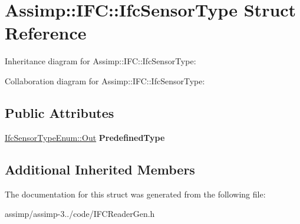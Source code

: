 \hypertarget{struct_assimp_1_1_i_f_c_1_1_ifc_sensor_type}{\section{Assimp\+:\+:I\+F\+C\+:\+:Ifc\+Sensor\+Type Struct Reference}
\label{struct_assimp_1_1_i_f_c_1_1_ifc_sensor_type}
}


Inheritance diagram for Assimp\+:\+:I\+F\+C\+:\+:Ifc\+Sensor\+Type\+:


Collaboration diagram for Assimp\+:\+:I\+F\+C\+:\+:Ifc\+Sensor\+Type\+:
\subsection*{Public Attributes}
\begin{DoxyCompactItemize}
\item 
\hypertarget{struct_assimp_1_1_i_f_c_1_1_ifc_sensor_type_a8156407f2e9b022223ee4cfb4c3347bf}{\hyperlink{classboost_1_1shared__ptr}{Ifc\+Sensor\+Type\+Enum\+::\+Out} {\bfseries Predefined\+Type}}\label{struct_assimp_1_1_i_f_c_1_1_ifc_sensor_type_a8156407f2e9b022223ee4cfb4c3347bf}

\end{DoxyCompactItemize}
\subsection*{Additional Inherited Members}


The documentation for this struct was generated from the following file\+:\begin{DoxyCompactItemize}
\item 
assimp/assimp-\/3../code/I\+F\+C\+Reader\+Gen.\+h\end{DoxyCompactItemize}
